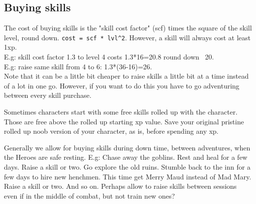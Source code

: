 


\subsection*{Buying skills}
The cost of buying skills is the "skill cost factor" (scf) times the square of the skill level, round down. \verb|cost = scf * lvl^2|. However, a skill will always cost at least 1xp. \\
E.g: skill cost factor 1.3 to level 4 costs 1.3*16=20.8 round down ~20. \\
E.g: raise same skill from 4 to 6: 1.3*(36-16)=26. \\
Note that it can be a little bit cheaper to raise skills a little bit at a time instead of a lot in one go. However, if you want to do this you have to go adventuring between every skill purchase.

Sometimes characters start with some free skills rolled up with the character. Those are free above the rolled up starting xp value. Save your original pristine rolled up noob version of your character, as is, before spending any xp.

Generally we allow for buying skills during down time, between adventures, when the Heroes are safe resting. E.g: Chase away the goblins. Rest and heal for a few days. Raise a skill or two. Go explore the old ruins. Stumble back to the inn for a few days to hire new henchmen. This time get Merry Maud instead of Mad Mary. Raise a skill or two. And so on. Perhaps allow to raise skills between sessions even if in the middle of combat, but not train new ones?




